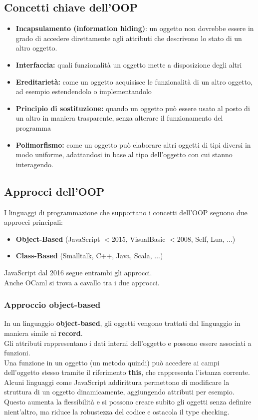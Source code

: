 \documentclass[12pt,a4paper]{article}
\begin{document}
\subsection{Concetti chiave dell'OOP}
\begin{itemize}
  \item \textbf{Incapsulamento (information hiding)}: un oggetto non dovrebbe essere in grado di accedere direttamente agli attributi che descrivono lo stato di un altro oggetto.
  \item \textbf{Interfaccia:} quali funzionalità un oggetto mette a disposizione degli altri
  \item \textbf{Ereditarietà:} come un oggetto acquisisce le funzionalità di un altro oggetto, ad esempio estendendolo o implementandolo
  \item \textbf{Principio di sostituzione:} quando un oggetto può essere usato al posto di un altro in maniera trasparente, senza alterare il funzionamento del programma
  \item \textbf{Polimorfismo:} come un oggetto può elaborare altri oggetti di tipi diversi in modo uniforme, adattandosi in base al tipo dell'oggetto con cui stanno interagendo.
\end{itemize}
\subsection{Approcci dell'OOP}
I linguaggi di programmazione che supportano i concetti dell'OOP seguono due approcci principali:
\begin{itemize}
  \item \textbf{Object-Based} (JavaScript $<$2015, VisualBasic $<$2008, Self, Lua, ...)
  \item \textbf{Class-Based} (Smalltalk, C++, Java, Scala, ...)
\end{itemize}
JavaScript dal 2016 segue entrambi gli approcci.\\
Anche OCaml si trova a cavallo tra i due approcci.
\subsubsection{Approccio object-based}
In un linguaggio \textbf{object-based}, gli oggetti vengono trattati dal linguaggio in maniera simile ai \textbf{record}.\\
Gli attributi rappresentano i dati interni dell'oggetto e possono essere associati a funzioni.\\
Una funzione in un oggetto (un metodo quindi) può accedere ai campi dell'oggetto stesso tramite il riferimento \textbf{this}, che rappresenta l'istanza corrente.\\
Alcuni linguaggi come JavaScript addirittura permettono di modificare la struttura di un oggetto dinamicamente, aggiungendo attributi per esempio.\\
Questo aumenta la flessibilità e si possono creare subito gli oggetti senza definire nient'altro, ma riduce la robustezza del codice e ostacola il type checking.
\end{document}
